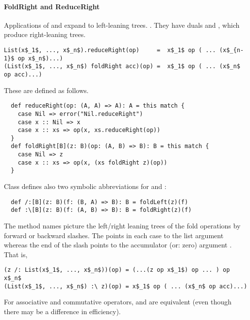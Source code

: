 \paragraph{FoldRight and ReduceRight}
Applications of  and  expand to
left-leaning trees. .  They have duals
 and , which produce right-leaning
trees.
\begin{lstlisting}
List(x$_1$, ..., x$_n$).reduceRight(op)     =  x$_1$ op ( ... (x$_{n-1}$ op x$_n$)...)
(List(x$_1$, ..., x$_n$) foldRight acc)(op) =  x$_1$ op ( ... (x$_n$ op acc)...)
\end{lstlisting}
These are defined as follows.
\begin{lstlisting}
  def reduceRight(op: (A, A) => A): A = this match {
    case Nil => error("Nil.reduceRight")
    case x :: Nil => x
    case x :: xs => op(x, xs.reduceRight(op))
  }
  def foldRight[B](z: B)(op: (A, B) => B): B = this match {
    case Nil => z
    case x :: xs => op(x, (xs foldRight z)(op))
  }
\end{lstlisting}

Class  defines also two symbolic abbreviations for
 and :
\begin{lstlisting}
  def /:[B](z: B)(f: (B, A) => B): B = foldLeft(z)(f)
  def :\[B](z: B)(f: (A, B) => B): B = foldRight(z)(f)
\end{lstlisting}
The method names picture the left/right leaning trees of the fold
operations by forward or backward slashes. The \code{:} points in each
case to the list argument whereas the end of the slash points to the
accumulator (or: zero) argument . 
That is, 
\begin{lstlisting}
(z /: List(x$_1$, ..., x$_n$))(op) = (...(z op x$_1$) op ... ) op x$_n$ 
(List(x$_1$, ..., x$_n$) :\ z)(op) = x$_1$ op ( ... (x$_n$ op acc)...)
\end{lstlisting}
For associative and commutative operators, \code{/:} and
\code{:\\} are equivalent (even though there may be a difference
in efficiency).  

